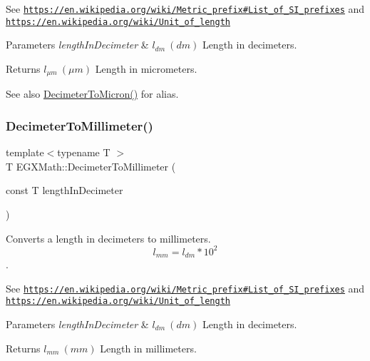 See \href{https://en.wikipedia.org/wiki/Metric_prefix#List_of_SI_prefixes}{\tt https\+://en.\+wikipedia.\+org/wiki/\+Metric\+\_\+prefix\#\+List\+\_\+of\+\_\+\+S\+I\+\_\+prefixes} and \href{https://en.wikipedia.org/wiki/Unit_of_length}{\tt https\+://en.\+wikipedia.\+org/wiki/\+Unit\+\_\+of\+\_\+length} 
\begin{DoxyParams}{Parameters}
{\em length\+In\+Decimeter} & $ l_{dm}\ (dm)$ Length in decimeters. \\
\hline
\end{DoxyParams}
\begin{DoxyReturn}{Returns}
$ l_{\mu m}\ (\mu m)$ Length in micrometers. 
\end{DoxyReturn}
\begin{DoxySeeAlso}{See also}
\mbox{\hyperlink{group___e_g_x_math-_conversions-_length_conversions-_decimeter-_non-_s_i_gaebafc6e167156bb5158e5d335b25334b}{Decimeter\+To\+Micron()}} for alias. 
\end{DoxySeeAlso}
\mbox{\label{group___e_g_x_math-_conversions-_length_conversions-_decimeter-_s_i_gad899e8bf5ade8cdc82e00b0fc81c2ee5}} 
\subsubsection{\texorpdfstring{Decimeter\+To\+Millimeter()}{DecimeterToMillimeter()}}
{\footnotesize\ttfamily template$<$typename T $>$ \\
T E\+G\+X\+Math\+::\+Decimeter\+To\+Millimeter (\begin{DoxyParamCaption}\item[{const T}]{length\+In\+Decimeter }\end{DoxyParamCaption})}



Converts a length in decimeters to millimeters. \[ l_{mm}=l_{dm} * 10^{2} \]. 

See \href{https://en.wikipedia.org/wiki/Metric_prefix#List_of_SI_prefixes}{\tt https\+://en.\+wikipedia.\+org/wiki/\+Metric\+\_\+prefix\#\+List\+\_\+of\+\_\+\+S\+I\+\_\+prefixes} and \href{https://en.wikipedia.org/wiki/Unit_of_length}{\tt https\+://en.\+wikipedia.\+org/wiki/\+Unit\+\_\+of\+\_\+length} 
\begin{DoxyParams}{Parameters}
{\em length\+In\+Decimeter} & $ l_{dm}\ (dm)$ Length in decimeters. \\
\hline
\end{DoxyParams}
\begin{DoxyReturn}{Returns}
$ l_{mm}\ (mm)$ Length in millimeters. 
\end{DoxyReturn}
\mbox{\label{group___e_g_x_math-_conversions-_length_conversions-_decimeter-_s_i_ga5bf2905937fea582ee35031d9017807f}} 
